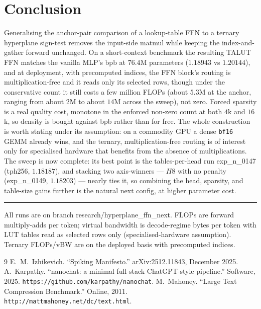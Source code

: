 \documentclass[11pt]{article}
\begin{document}
\section{Conclusion}
\label{sec:conclusion}
Generalising the anchor-pair comparison of a lookup-table FFN to a ternary hyperplane sign-test
removes the input-side matmul while keeping the index-and-gather forward unchanged. On a
short-context benchmark the resulting TALUT FFN matches the vanilla MLP's bpb at $76.4$M
parameters ($1.18943$ vs $1.20144$), and at deployment, with precomputed indices, the FFN block's
routing is multiplication-free and it reads only its selected rows, though under the conservative
count it still costs a few million FLOPs (about $5.3$M at the anchor, ranging from about $2$M to
about $14$M across the sweep), not zero. Forced sparsity is a
real quality cost, monotone in the enforced non-zero count at both $4$k and $16$k, so density is
bought against bpb rather than for free. The whole construction is worth stating under its
assumption: on a commodity GPU a dense \texttt{bf16} GEMM already wins, and the ternary,
multiplication-free routing is of interest only for specialised hardware that benefits from the
absence of multiplications. The sweep is now complete: its best point is the tables-per-head run
exp\_n\_0147 (tph256, $1.18187$), and stacking two axis-winners --- $H8$ with no penalty
(exp\_n\_0149, $1.18203$) --- nearly ties it, so combining the head, sparsity, and table-size
gains further is the natural next config, at higher parameter cost.

\vspace{0.5em}
\hrule
\vspace{0.4em}
{\footnotesize All runs are on branch research/hyperplane\_ffn\_next. FLOPs are forward
multiply-adds per token; virtual bandwidth is decode-regime bytes per token with LUT tables
read as selected rows only (specialised-hardware assumption). Ternary FLOPs/vBW are on the
deployed basis with precomputed indices.}

\begin{thebibliography}{9}
 E.~M.~Izhikevich.
``Spiking Manifesto.''
arXiv:2512.11843, December 2025.
 A.~Karpathy. ``nanochat: a minimal full-stack ChatGPT-style pipeline.''
Software, 2025. \texttt{https://github.com/karpathy/nanochat}.
 M.~Mahoney. ``Large Text Compression Benchmark.'' Online, 2011.
\texttt{http://mattmahoney.net/dc/text.html}.
\end{thebibliography}
\end{document}

